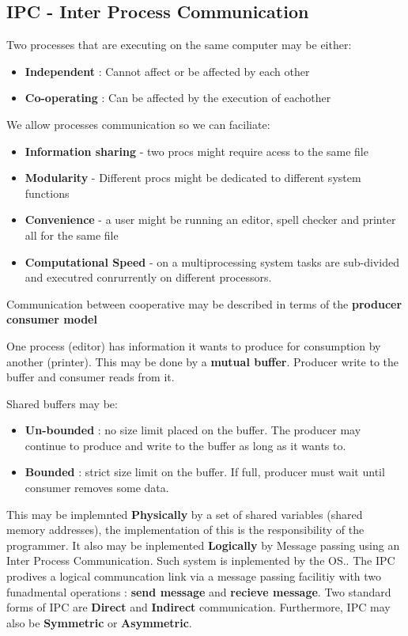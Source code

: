 \documentclass[a4paper, 10pt]{article}
\begin{document}
\subsection{IPC - Inter Process Communication}
\begin{definitionbox}
    Two processes that are executing on the same computer may be either:
    \begin{itemize}
        \item \textbf{Independent} : Cannot affect or be affected by each other
        \item \textbf{Co-operating} : Can be affected by the execution of eachother
    \end{itemize}
\end{definitionbox}
We allow processes communication so we can faciliate:
\begin{itemize}
    \item \textbf{Information sharing} - two procs might require acess to the same file
    \item \textbf{Modularity} - Different procs might be dedicated to different system functions
    \item \textbf{Convenience} - a user might be running an editor, spell checker and printer all for the same file
    \item \textbf{Computational Speed} - on a multiprocessing system tasks are sub-divided and executred conrurrently on different processors.
\end{itemize}
Communication between cooperative may be described in terms of the \textbf{producer consumer model}

\begin{definitionbox}
    One process (editor) has information it wants to produce for consumption by another (printer). This may be done by a \textbf{mutual buffer}. Producer write to the buffer and consumer reads from it.
\end{definitionbox}

\begin{conceptbox}
    Shared buffers may be:
    \begin{itemize}
        \item \textbf{Un-bounded} : no size limit placed on the buffer. The producer may continue to produce and write to the buffer as long as it wants to.
        \item \textbf{Bounded} : strict size limit on the buffer. If full, producer must wait until consumer removes some data.
    \end{itemize}
\end{conceptbox}
This may be implemnted \textbf{Physically} by a set of shared variables (shared memory addresses), the implementation of this is the responsibility of the programmer. It also may be inplemented \textbf{Logically} by Message passing using an Inter Process Communication. Such system is inplemented by the OS.. The IPC prodives a logical communcation link via a message passing facilitiy with two funadmental operations : \textbf{send message} and \textbf{recieve message}.
Two standard forms of IPC are \textbf{Direct} and \textbf{Indirect} communication. Furthermore, IPC may also be \textbf{Symmetric} or \textbf{Asymmetric}.
\end{document}
